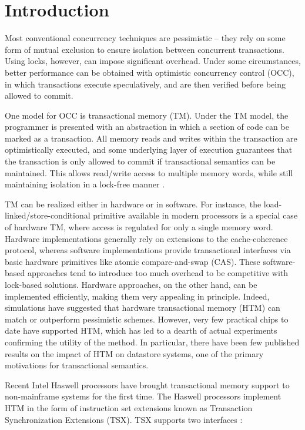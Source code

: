\section{Introduction} \label{sec:intro}

Most conventional concurrency techniques are pessimistic -- they rely on some
form of mutual exclusion to ensure isolation between concurrent
transactions. Using locks, however, can impose significant overhead. Under some
circumstances, better performance can be obtained with optimistic concurrency
control (OCC), in which transactions execute speculatively, and are then
verified before being allowed to commit.

One model for OCC is transactional memory (TM). Under the TM model, the
programmer is presented with an abstraction in which a section of code can be
marked as a transaction. All memory reads and writes within the transaction are
optimistically executed, and some underlying layer of execution guarantees that
the transaction is only allowed to commit if transactional semantics can be
maintained. This allows read/write access to multiple memory words, while still
maintaining isolation in a lock-free manner \citep{Herlihy93}.

TM can be realized either in hardware or in software. For instance, the
load-linked/store-conditional primitive available in modern processors is a
special case of hardware TM, where access is regulated for only a single memory
word. Hardware implementations generally rely on extensions to the
cache-coherence protocol, whereas software implementations provide transactional
interfaces via basic hardware primitives like atomic compare-and-swap
(CAS). These software-based approaches tend to introduce too much overhead to be
competitive with lock-based solutions. Hardware approaches, on the other hand,
can be implemented efficiently, making them very appealing in principle. Indeed,
simulations have suggested that hardware transactional memory (HTM) can match or
outperform pessimistic schemes. However, very few practical chips to date have
supported HTM, which has led to a dearth of actual experiments confirming the
utility of the method. In particular, there have been few published results on
the impact of HTM on datastore systems, one of the primary motivations for
transactional semantics.

Recent Intel Haswell processors have brought transactional memory support to
non-mainframe systems for the first time. The Haswell processors implement HTM
in the form of instruction set extensions known as Transaction Synchronization
Extensions (TSX). TSX supports two interfaces \citep{tsx-intro}: \\


